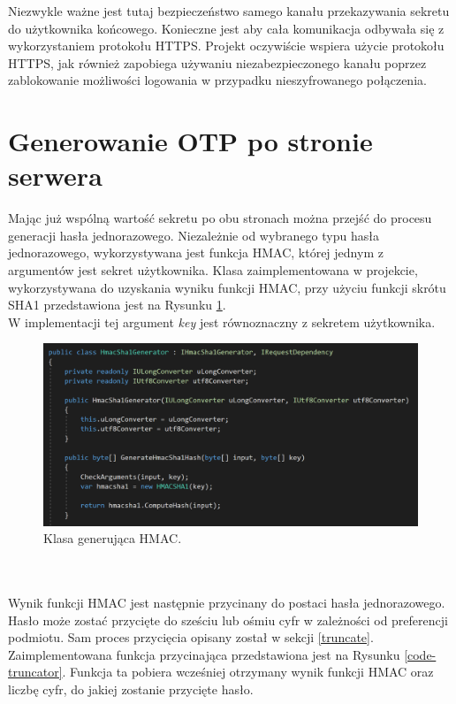 Niezwykle ważne jest tutaj bezpieczeństwo samego kanału przekazywania sekretu do użytkownika końcowego. 
Konieczne jest aby cała komunikacja odbywała się z wykorzystaniem protokołu HTTPS. 
Projekt oczywiście wspiera użycie protokołu HTTPS, jak również zapobiega używaniu niezabezpieczonego kanału 
poprzez zablokowanie możliwości logowania w przypadku nieszyfrowanego połączenia.

\section{Generowanie OTP po stronie serwera}
Mając już wspólną wartość sekretu po obu stronach można przejść do procesu generacji hasła jednorazowego.
Niezależnie od wybranego typu hasła jednorazowego, wykorzystywana jest funkcja HMAC, której jednym z argumentów
jest sekret użytkownika. Klasa zaimplementowana w projekcie, wykorzystywana do uzyskania wyniku funkcji HMAC, 
przy użyciu funkcji skrótu SHA1 przedstawiona jest na Rysunku \ref{code-hmac}. \\
W implementacji tej argument \textit{key} jest równoznaczny z sekretem użytkownika.
\begin{figure}[t]
    \centering
	\includegraphics[width=\textwidth]{content/images/code-hmac}
    \caption{Klasa generująca HMAC.}
    \label{code-hmac}
\end{figure} \\ \\
Wynik funkcji HMAC jest następnie przycinany do postaci hasła jednorazowego. 
Hasło może zostać przycięte do sześciu lub ośmiu cyfr w zależności od preferencji podmiotu.
Sam proces przycięcia opisany został w sekcji \ref{truncate}. \\
Zaimplementowana funkcja przycinająca przedstawiona jest na Rysunku \ref{code-truncator}.
Funkcja ta pobiera wcześniej otrzymany wynik funkcji HMAC oraz liczbę cyfr, do jakiej zostanie przycięte hasło.
